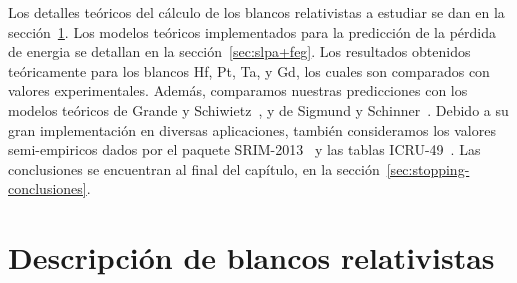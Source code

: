 
Los detalles teóricos del cálculo de los blancos relativistas a estudiar 
se dan en la sección~\ref{sec:blancos-relat}. Los modelos teóricos 
implementados para la predicción de la pérdida de energia se detallan 
en la sección~\ref{sec:slpa+feg}. Los resultados obtenidos teóricamente 
para los blancos Hf, Pt, Ta, y Gd, los cuales son comparados con valores 
experimentales. Además, comparamos nuestras predicciones con los 
modelos teóricos de Grande y Schiwietz~\cite{Grande:01,casp52}, y de 
Sigmund y Schinner~\cite{DPASS20}. Debido a su gran implementación en 
diversas aplicaciones, también consideramos los valores semi-empiricos 
dados por el paquete SRIM-2013~\cite{Ziegler01} y las tablas 
ICRU-49~\cite{ICRU49}. Las conclusiones se encuentran al final del capítulo,
en la sección~\ref{sec:stopping-conclusiones}.

\section{Descripción de blancos relativistas}
\label{sec:blancos-relat}

